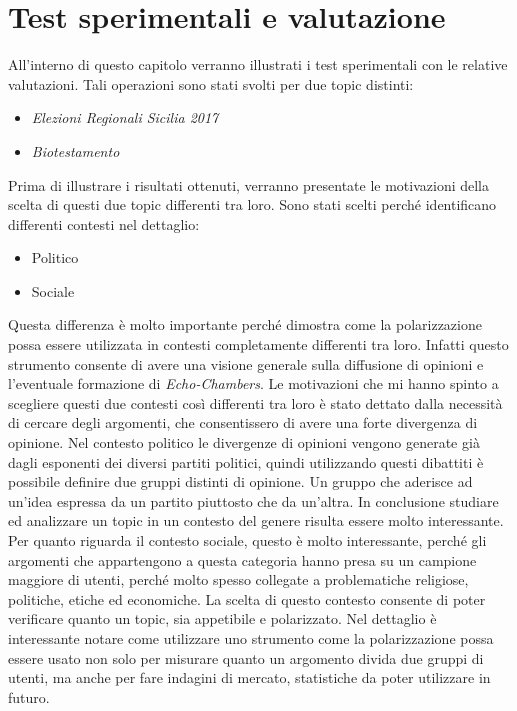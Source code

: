\chapter{Test sperimentali e valutazione}
\label{capitolo6}
\thispagestyle{empty}




All'interno di questo capitolo verranno illustrati i test sperimentali con le relative valutazioni.
Tali operazioni sono stati svolti per due topic distinti:
\begin{itemize}
\item \textit{Elezioni Regionali Sicilia 2017}
\item \textit{Biotestamento}
\end{itemize}
Prima di illustrare i risultati ottenuti, verranno presentate le motivazioni della scelta di questi due topic differenti tra loro.
Sono stati scelti perché identificano differenti contesti nel dettaglio:
\begin{itemize}
\item Politico
\item Sociale
\end{itemize}
Questa differenza è molto importante perché dimostra come la polarizzazione possa essere utilizzata in contesti completamente differenti tra loro. Infatti questo strumento consente di avere una visione generale sulla diffusione di opinioni e l'eventuale formazione di \textit{Echo-Chambers}. 
Le motivazioni che mi hanno spinto a scegliere questi due contesti così differenti tra loro è stato dettato dalla necessità di cercare degli argomenti, che consentissero di avere una forte divergenza di opinione.
Nel contesto politico le divergenze di opinioni vengono generate già dagli esponenti dei diversi partiti politici, quindi utilizzando questi dibattiti è possibile definire due gruppi distinti di opinione. Un gruppo che aderisce ad un'idea espressa da un partito piuttosto che da un'altra. In conclusione studiare ed analizzare un topic in un contesto del genere risulta essere molto interessante.
Per quanto riguarda il contesto sociale, questo è molto interessante, perché gli argomenti che appartengono a questa categoria hanno presa su un campione maggiore di utenti, perché molto spesso collegate a problematiche religiose, politiche, etiche ed economiche. La scelta di questo contesto consente di poter verificare quanto un topic, sia appetibile e polarizzato. Nel dettaglio è interessante notare come utilizzare uno strumento come la polarizzazione possa essere usato non solo per misurare quanto un argomento divida due gruppi di utenti, ma anche per fare indagini di mercato, statistiche da poter utilizzare in futuro.
\newpage
